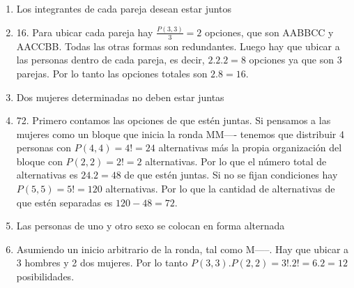 \documentclass[a4paper]{article}
\newcommand{\answer}{\item[**]}
\begin{document}
\begin{enumerate}
\begin{enumerate} [label=(\alph*)]
		\item Los integrantes de cada pareja desean estar juntos
		\answer 16. Para ubicar cada pareja hay $\frac{P(3,3)}{3}=2$ opciones, que son AABBCC y AACCBB. Todas las otras formas son redundantes. Luego hay que ubicar a las personas dentro de cada pareja, es decir, $2.2.2=8$ opciones ya que son 3 parejas. Por lo tanto las opciones totales son $2.8=16$.
		
		\item Dos mujeres determinadas no deben estar juntas
		\answer 72. Primero contamos las opciones de que estén juntas. Si pensamos a las mujeres como un bloque que inicia la ronda MM---- tenemos que distribuir 4 personas con $P(4,4)=4!=24$ alternativas más la propia organización del bloque con $P(2,2)=2!=2$ alternativas. Por lo que el número total de alternativas es $24.2=48$ de que estén juntas. Si no se fijan condiciones hay $P(5,5)=5!=120$ alternativas. Por lo que la cantidad de alternativas de que estén separadas es $120-48=72$.

		\item Las personas de uno y otro sexo se colocan en forma alternada
		\answer Asumiendo un inicio arbitrario de la ronda, tal como M-----. Hay que ubicar a 3 hombres y 2 dos mujeres. Por lo tanto $P(3,3).P(2,2)=3!.2!=6.2=12$ posibilidades.

	\end{enumerate}

\end{enumerate}
\end{document}
